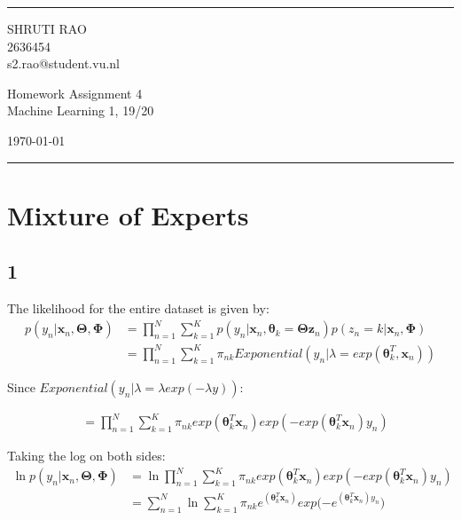 \documentclass[a4paper]{article}
\begin{document}

\fancyhead[C]{}
\hrule \medskip %
\begin{minipage}{0.295\textwidth} 
\raggedright
\footnotesize
SHRUTI RAO \hfill\\   
2636454 \hfill\\
s2.rao@student.vu.nl
\end{minipage}
\begin{minipage}{0.4\textwidth} 
\centering 
\large 
Homework Assignment 4\\ 
\normalsize 
Machine Learning 1, 19/20\\ 
\end{minipage}
\begin{minipage}{0.295\textwidth} 
\raggedleft
\today\hfill\\
\end{minipage}
\medskip\hrule 
\bigskip


\section*{Mixture of Experts}
\subsection*{1}
The likelihood for the entire dataset is given by:
\begin{align*}
    p(y_{n}|\pmb{x}_{n}, \pmb{\Theta}, \pmb{\Phi}) &= \prod_{n=1}^{N} \sum_{k=1}^{K} p(y_{n}|\pmb{x}_{n}, \pmb{\theta}_{k} = \pmb{\Theta z}_{n}) p(z_{n}=k| \pmb{x}_{n}, \pmb{\Phi}) \\
    &= \prod_{n=1}^{N} \sum_{k=1}^{K} \pi_{nk} Exponential(y_{n}|\lambda = exp(\pmb{\theta}_{k}^{T}, \pmb{x}_{n}))
\end{align*}{}

Since $Exponential(y_{n}|\lambda = \lambda exp(-\lambda y))$:

\begin{align*}
    &= \prod_{n=1}^{N} \sum_{k=1}^{K} \pi_{nk} exp(\pmb{\theta}_{k}^{T} \pmb{x}_{n}) exp(-exp(\pmb{\theta}_{k}^{T} \pmb{x}_{n})y_{n})
\end{align*}{}

Taking the log on both sides:
\begin{align*}
    \ln{p(y_{n}|\pmb{x}_{n}, \pmb{\Theta}, \pmb{\Phi})} &= \ln{\prod_{n=1}^{N} \sum_{k=1}^{K} \pi_{nk} exp(\pmb{\theta}_{k}^{T} \pmb{x}_{n}) exp(-exp(\pmb{\theta}_{k}^{T} \pmb{x}_{n})y_{n})} \\
    &= \sum_{n=1}^{N} \ln{\sum_{k=1}^{K} \pi_{nk} e^{(\pmb{\theta}_{k}^{T} \pmb{x}_{n})} exp(-e^{(\pmb{\theta}_{k}^{T} \pmb{x}_{n})y_{n}}}) \\
\end{align*}{}
\end{document}
